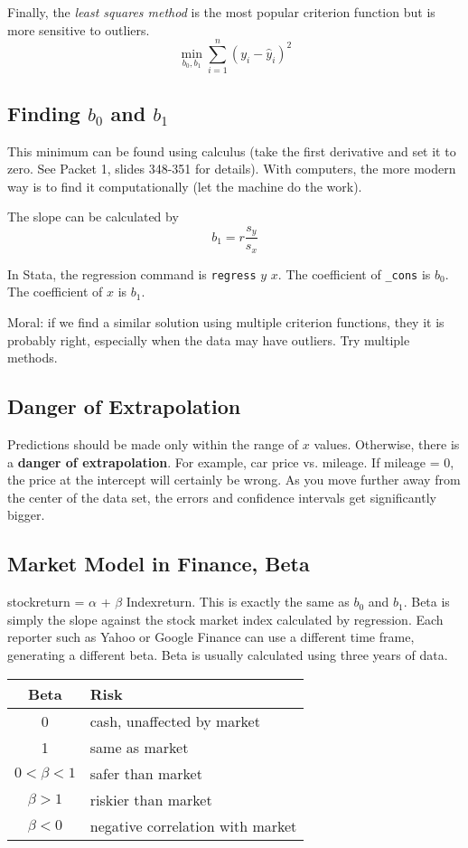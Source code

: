 \documentclass[11pt, oneside]{article}   	%
\begin{document}
Finally, the \textit{least squares method} is the most popular criterion function but is more sensitive to outliers.
\[
\min_{b_0, b_1} \sum\limits_{i=1}^n (y_i - \hat{y}_i)^2
\]

\subsection{Finding $b_0$ and $b_1$}

This minimum can be found using calculus (take the first derivative and set it to zero. See Packet 1, slides 348-351 for details). With computers, the more modern way is to find it computationally (let the machine do the work).

The slope can be calculated by
\[
b_1 = r \frac{s_y}{s_x}
\]

In Stata, the regression command is \texttt{regress} $y$ $x$. The coefficient of \texttt{\_cons} is $b_0$. The coefficient of $x$ is $b_1$.

Moral: if we find a similar solution using multiple criterion functions, they it is probably right, especially when the data may have outliers. Try multiple methods.

\subsection{Danger of Extrapolation}

Predictions should be made only within the range of $x$ values. Otherwise, there is a \textbf{danger of extrapolation}. For example, car price vs. mileage. If mileage = 0, the price at the intercept will certainly be wrong. As you move further away from the center of the data set, the errors and confidence intervals get significantly bigger.

\subsection{Market Model in Finance, Beta}

stockreturn = $\alpha$ + $\beta$ Indexreturn. This is exactly the same as $b_0$ and $b_1$. Beta is simply the slope against the stock market index calculated by regression. Each reporter such as Yahoo or Google Finance can use a different time frame, generating a different beta. Beta is usually calculated using three years of data.

\begin{tabular}{c | l}
Beta & Risk\\
\hline
0 & cash, unaffected by market\\
1 & same as market \\
$0<\beta<1$ & safer than market \\
$\beta>1$ & riskier than market \\
$\beta < 0$ & negative correlation with market\\
\end{tabular}
\end{document}
